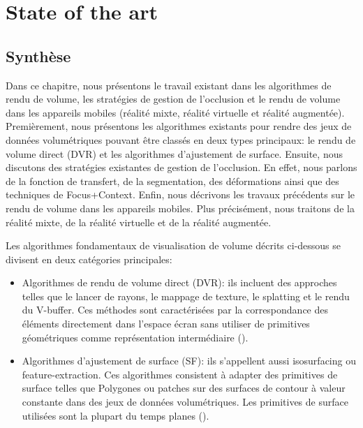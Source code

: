 \chapter{State of the art} %
\label{StateOfTheArt}

\section{Synthèse}
Dans ce chapitre, nous présentons le travail existant dans les algorithmes de rendu de volume, les stratégies de gestion de l'occlusion et le rendu de volume dans les appareils mobiles (réalité mixte, réalité virtuelle et réalité augmentée). Premièrement, nous présentons les algorithmes existants pour rendre des jeux de données volumétriques pouvant être classés en deux types principaux: le rendu de volume direct (DVR) et les algorithmes d'ajustement de surface. Ensuite, nous discutons des stratégies existantes de gestion de l'occlusion. En effet, nous parlons de la fonction de transfert, de la segmentation, des déformations ainsi que des techniques de Focus+Context. Enfin, nous décrivons les travaux précédents sur le rendu de volume dans les appareils mobiles. Plus précisément, nous traitons de la réalité mixte, de la réalité virtuelle et de la réalité augmentée.

Les algorithmes fondamentaux de visualisation de volume décrits
ci-dessous se divisent en deux catégories principales:

\begin{itemize}

\item Algorithmes de rendu de volume direct (DVR): ils incluent des approches telles que le lancer de rayons, le mappage de texture, le splatting et le rendu du V-buffer. Ces méthodes sont caractérisées par la correspondance des éléments directement dans l'espace écran sans utiliser de primitives géométriques comme représentation intermédiaire (\cite{Stegmaier:2005:SFV:2386472.2386498}).

\item Algorithmes d'ajustement de surface (SF): ils s'appellent aussi isosurfacing ou feature-extraction. Ces algorithmes consistent à adapter des primitives de surface telles que
Polygones ou patches sur des surfaces de contour à valeur constante dans des jeux de données volumétriques. Les primitives de surface utilisées sont la plupart du temps planes (\cite{Lorensen:1987:MCA}).

\end{itemize}

